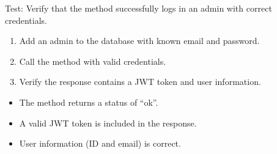 \documentclass[letterpaper,10pt,english]{sphinxmanual}
\begin{document}
\begin{fulllineitems}
\label{\detokenize{test:test.test_admin.test_login_admin_success}}
\pysigstartsignatures
\pysiglinewithargsret
{}
{}
{}
\pysigstopsignatures
\sphinxAtStartPar
Test: Verify that the method successfully logs in an admin with correct credentials.
\begin{description}
\begin{enumerate}
%
\item {} 
\sphinxAtStartPar
Add an admin to the database with known email and password.

\item {} 
\sphinxAtStartPar
Call the  method with valid credentials.

\item {} 
\sphinxAtStartPar
Verify the response contains a JWT token and user information.

\end{enumerate}

\begin{itemize}
\item {} 
\sphinxAtStartPar
The method returns a status of “ok”.

\item {} 
\sphinxAtStartPar
A valid JWT token is included in the response.

\item {} 
\sphinxAtStartPar
User information (ID and email) is correct.

\end{itemize}

\end{description}

\end{fulllineitems}

\end{document}
